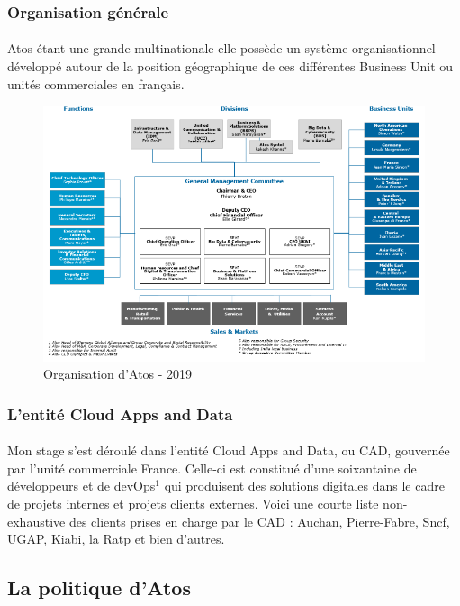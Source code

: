 \documentclass[12pt]{article}
\begin{document}
\begin {sloppypar}
\subsubsection{Organisation générale}
\paragraph{}
Atos étant une grande multinationale elle possède un système organisationnel développé 
autour de la position géographique de ces différentes Business Unit ou unités commerciales
en français. 

\begin{figure}[h]
  \includegraphics[width=\textwidth] {orga_atos.png}
  \caption {Organisation d'Atos - 2019 }
\end{figure}

\subsubsection{L'entité Cloud Apps and Data}
\paragraph{}
Mon stage s'est déroulé dans l'entité Cloud Apps and Data, ou CAD, gouvernée par 
l'unité commerciale France. Celle-ci est constitué d'une soixantaine de développeurs et de devOps$^{1}$ qui produisent 
des solutions digitales dans le cadre de projets internes et projets clients externes.
Voici une courte liste non-exhaustive des clients prises en charge par le CAD : Auchan, Pierre-Fabre, Sncf, UGAP, Kiabi,
 la Ratp et bien d'autres.

\subsection{La politique d'Atos}

\end{sloppypar}
\end{document}
